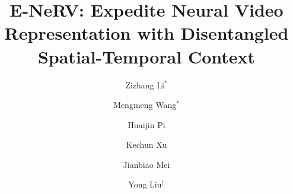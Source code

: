 \documentclass[runningheads]{llncs}
\begin{document}
\pagestyle{headings}
\mainmatter
\def\ECCVSubNumber{5463}  

\title{E-NeRV: Expedite Neural Video Representation with Disentangled Spatial-Temporal Context} 



\author{Zizhang Li$^{*}$ \and Mengmeng Wang$^{*}$ \and Huaijin Pi \and Kechun Xu \and Jianbiao Mei \and Yong Liu$^{\dag}$}
\maketitle
\let\thefootnote\relax{}

\newcommand{\netname}{E-NeRV }

\newcommand{\ba}{\mathbf{a}}\newcommand{\bA}{\mathbf{A}}
\newcommand{\bb}{\mathbf{b}}\newcommand{\bB}{\mathbf{B}}
\newcommand{\bc}{\mathbf{c}}\newcommand{\bC}{\mathbf{C}}
\newcommand{\bd}{\mathbf{d}}\newcommand{\bD}{\mathbf{D}}
\newcommand{\be}{\mathbf{e}}\newcommand{\bE}{\mathbf{E}}
\newcommand{\bff}{\mathbf{f}}\newcommand{\bF}{\mathbf{F}} \newcommand{\bg}{\mathbf{g}}\newcommand{\bG}{\mathbf{G}}
\newcommand{\bh}{\mathbf{h}}\newcommand{\bH}{\mathbf{H}}
\newcommand{\bi}{\mathbf{i}}\newcommand{\bI}{\mathbf{I}}
\newcommand{\bj}{\mathbf{j}}\newcommand{\bJ}{\mathbf{J}}
\newcommand{\bk}{\mathbf{k}}\newcommand{\bK}{\mathbf{K}}
\newcommand{\bl}{\mathbf{l}}\newcommand{\bL}{\mathbf{L}}
\newcommand{\bm}{\mathbf{m}}\newcommand{\bM}{\mathbf{M}}
\newcommand{\bn}{\mathbf{n}}\newcommand{\bN}{\mathbf{N}}
\newcommand{\bo}{\mathbf{o}}\newcommand{\bO}{\mathbf{O}}
\newcommand{\bp}{\mathbf{p}}\newcommand{\bP}{\mathbf{P}}
\newcommand{\bq}{\mathbf{q}}\newcommand{\bQ}{\mathbf{Q}}
\newcommand{\br}{\mathbf{r}}\newcommand{\bR}{\mathbf{R}}
\newcommand{\bs}{\mathbf{s}}\newcommand{\bS}{\mathbf{S}}
\newcommand{\bt}{\mathbf{t}}\newcommand{\bT}{\mathbf{T}}
\newcommand{\bu}{\mathbf{u}}\newcommand{\bU}{\mathbf{U}}
\newcommand{\bv}{\mathbf{v}}\newcommand{\bV}{\mathbf{V}}
\newcommand{\bw}{\mathbf{w}}\newcommand{\bW}{\mathbf{W}}
\newcommand{\bx}{\mathbf{x}}\newcommand{\bX}{\mathbf{X}}
\newcommand{\by}{\mathbf{y}}\newcommand{\bY}{\mathbf{Y}}
\newcommand{\bz}{\mathbf{z}}\newcommand{\bZ}{\mathbf{Z}}
\end{document}
